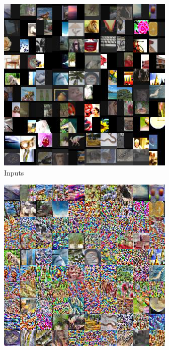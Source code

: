 


\begin{figure}[hbt!]
\begin{subfigure}{.49\linewidth}\centering
\includegraphics[width=\textwidth]{grids/data_cifar100_arch_ResNet20-4_epoch_200_optim_inversed_mode_aug_auglist_3-1-7+43-18-18_rlabel_False_ORIGINALS.png}
\caption{Inputs}%
\end{subfigure}%
\hfill
\begin{subfigure}{.49\linewidth}\centering
\includegraphics[width=\textwidth]{grids/data_cifar100_arch_ResNet20-4_epoch_200_optim_inversed_mode_aug_auglist_3-1-7+43-18-18_rlabel_False_RECONSTRUCTIONS.png}

\end{subfigure}
\end{figure}
